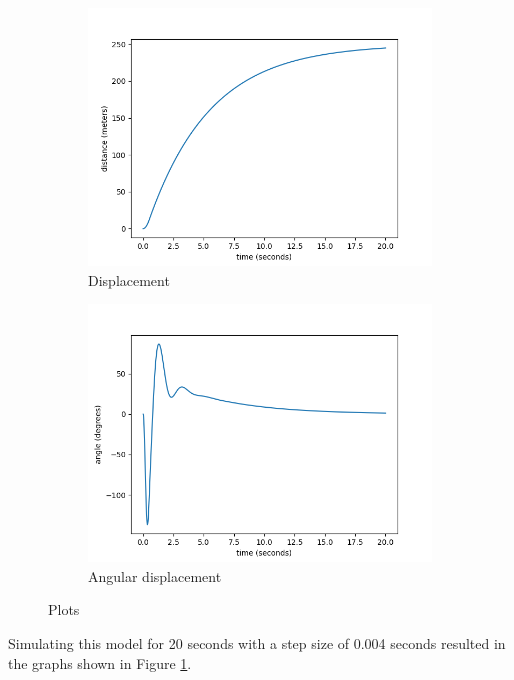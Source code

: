\documentclass{article}
\begin{document}
\begin{figure}[h]
    \begin{subfigure}[b]{0.5\textwidth}
        \includegraphics[width=\linewidth]{graphs/gantry_system_displacement.png}
        \caption{Displacement}
    \end{subfigure}
    \begin{subfigure}[b]{0.5\textwidth}
        \includegraphics[width=\linewidth]{graphs/gantry_system_angular_displacement.png}
        \caption{Angular displacement}
    \end{subfigure}
    \caption{Plots}
    \label{fig:gantry_system}
\end{figure}

Simulating this model for 20 seconds with a step size of 0.004 seconds resulted in the graphs shown in Figure \ref{fig:gantry_system}. 
\end{document}
